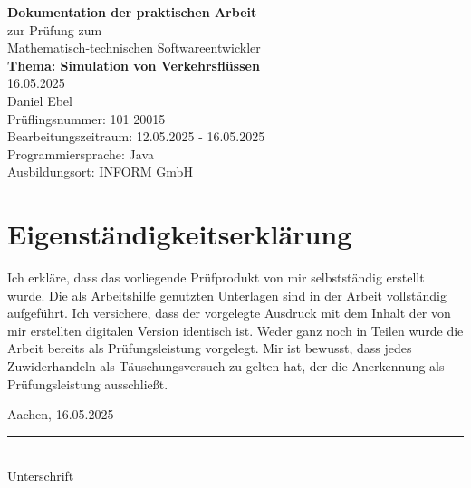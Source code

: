 \documentclass[a4paper,12pt]{report}
\begin{document}
\begin{titlepage}
    \centering
    \vspace*{3cm}
    {\Huge \textbf{Dokumentation der praktischen Arbeit}}\\[2cm]
    {\large zur Prüfung zum \\ Mathematisch-technischen Softwareentwickler}\\[2cm]
    {\Large \textbf{Thema: Simulation von Verkehrsflüssen}}\\[1cm]
    {16.05.2025}\\[5cm]
    {Daniel Ebel}\\[2cm]
    Prüflingsnummer: 101 20015\\[0.5cm]
    Bearbeitungszeitraum: 12.05.2025 - 16.05.2025\\[0.5cm]
    Programmiersprache: Java\\[0.5cm]
    Ausbildungsort: INFORM GmbH
\end{titlepage}

\chapter*{Eigenständigkeitserklärung}
Ich erkläre, dass das vorliegende Prüfprodukt von mir selbstständig erstellt wurde.
Die als Arbeitshilfe genutzten Unterlagen sind in der Arbeit vollständig aufgeführt.
Ich versichere, dass der vorgelegte Ausdruck mit dem Inhalt der von mir erstellten digitalen Version identisch ist.
Weder ganz noch in Teilen wurde die Arbeit bereits als Prüfungsleistung vorgelegt.
Mir ist bewusst, dass jedes Zuwiderhandeln als Täuschungsversuch zu gelten hat, der die Anerkennung als Prüfungsleistung ausschließt.

\vspace{2cm}

Aachen, 16.05.2025

\vspace{1cm}

\noindent\rule{7cm}{0.4pt}\\
Unterschrift

\tableofcontents












\end{document}
